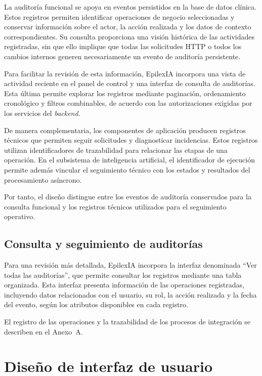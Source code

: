 La auditoría funcional se apoya en eventos persistidos en la base de datos clínica. Estos registros permiten identificar operaciones de negocio seleccionadas y conservar información sobre el actor, la acción realizada y los datos de contexto correspondientes. Su consulta proporciona una visión histórica de las actividades registradas, sin que ello implique que todas las solicitudes HTTP o todos los cambios internos generen necesariamente un evento de auditoría persistente.

Para facilitar la revisión de esta información, EpilexIA incorpora una vista de actividad reciente en el panel de control y una interfaz de consulta de auditorías. Esta última permite explorar los registros mediante paginación, ordenamiento cronológico y filtros combinables, de acuerdo con las autorizaciones exigidas por los servicios del \textit{backend}.

De manera complementaria, los componentes de aplicación producen registros técnicos que permiten seguir solicitudes y diagnosticar incidencias. Estos registros utilizan identificadores de trazabilidad para relacionar las etapas de una operación. En el subsistema de inteligencia artificial, el identificador de ejecución permite además vincular el seguimiento técnico con los estados y resultados del procesamiento asíncrono.

Por tanto, el diseño distingue entre los eventos de auditoría conservados para la consulta funcional y los registros técnicos utilizados para el seguimiento operativo.

\subsection{Consulta y seguimiento de auditorías}
\label{subsec:consulta-seguimiento-auditorias}

Para una revisión más detallada, EpilexIA incorpora la interfaz denominada ``Ver todas las auditorías'', que permite consultar los registros mediante una tabla organizada. Esta interfaz presenta información de las operaciones registradas, incluyendo datos relacionados con el usuario, su rol, la acción realizada y la fecha del evento, según los atributos disponibles en cada registro.

\begin{nuevotexto}
El registro de las operaciones y la trazabilidad de los procesos de integración se describen en el Anexo~A.
\end{nuevotexto}

\section{Diseño de interfaz de usuario}
\label{sec:diseno-interfaz-usuario}


